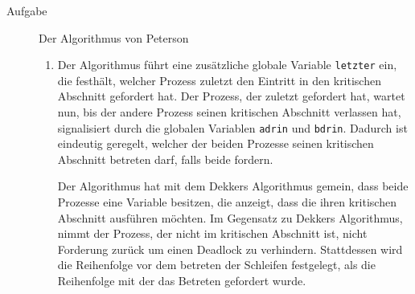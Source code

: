 \documentclass[a4paper,twoside,12pt,fleqn]{article}
\newcounter{AUFGNR}
\newcommand{\AUFGABE}[2]{\vspace{0.3cm}\item[Aufgabe~\arabic{AUFGNR}]\stepcounter{AUFGNR} #1\hfill\emph{#2}}
\begin{document}
\begin{description}
\AUFGABE{Der Algorithmus von Peterson}{}
\begin{enumerate}
\item Der Algorithmus führt eine zusätzliche globale Variable \texttt{letzter} ein, die festhält, welcher Prozess zuletzt den Eintritt in den kritischen Abschnitt gefordert hat. Der Prozess, der zuletzt gefordert hat, wartet nun, bis der andere Prozess seinen kritischen Abschnitt verlassen hat, signalisiert durch die globalen Variablen \texttt{adrin} und \texttt{bdrin}. Dadurch ist eindeutig geregelt, welcher der beiden Prozesse seinen kritischen Abschnitt betreten darf, falls beide fordern. 

Der Algorithmus hat mit dem Dekkers Algorithmus gemein, dass beide Prozesse eine Variable besitzen, die anzeigt, dass die ihren kritischen Abschnitt ausführen möchten. Im Gegensatz zu Dekkers Algorithmus, nimmt der Prozess, der nicht im kritischen Abschnitt ist, nicht Forderung zurück um einen Deadlock zu verhindern. Stattdessen wird die Reihenfolge vor dem betreten der Schleifen festgelegt, als die Reihenfolge mit der das Betreten gefordert wurde.
\end{enumerate}
\end{description}
\end{document}
